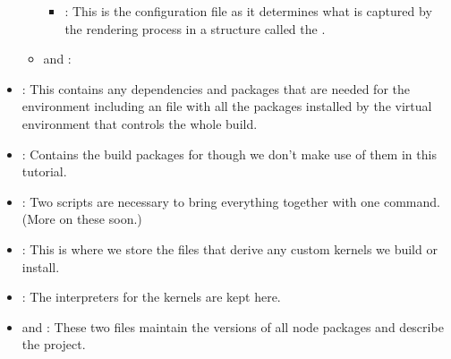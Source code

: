 \documentclass[letterpaper,12pt,english]{sphinxmanual}
\begin{document}
\begin{itemize}
\begin{itemize}
\begin{itemize}
\item {} 
\sphinxAtStartPar
{} : This is the  configuration file as it determines what is captured by the rendering process in a structure called the .

\end{itemize}

\item {} 
\sphinxAtStartPar
{} and  :

\end{itemize}

\item {} 
\sphinxAtStartPar
{} : This contains any dependencies and packages that are needed for the environment including an  file with all the packages installed by the virtual  environment that controls the whole build.

\item {} 
\sphinxAtStartPar
{} : Contains the build packages for  though we don’t make use of them in this tutorial.

\item {} 
\sphinxAtStartPar
{} : Two  scripts are necessary to bring everything together with one command. (More on these soon.)

\item {} 
\sphinxAtStartPar
{} : This is where we store the files that derive any custom kernels we build or install.

\item {} 
\sphinxAtStartPar
{} : The interpreters for the kernels are kept here.

\item {} 
\sphinxAtStartPar
{} and  : These two files maintain the versions of all node packages and describe the project.

\end{itemize}
\end{document}
